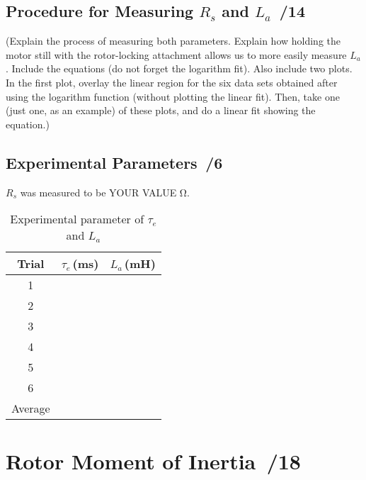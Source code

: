 \documentclass{article}
\newcommand{\score}{\hfill \underline{\hspace{0.65cm}}\,/} %
\begin{document}
\subsection{Procedure for Measuring $R_s$ and $L_a$ \score 14}
(Explain the process of measuring both parameters. Explain how holding the motor still with the rotor-locking attachment allows us to more easily measure $L_a$. Include the equations (do not forget the logarithm fit). 
Also include two plots. In the first plot, overlay the linear region for the six data sets obtained after using the logarithm function (without plotting the linear fit). Then, take one (just one, as an example) of these plots, and do a linear fit showing the equation.)


\subsection{Experimental Parameters \score 6}
$R_s$ was measured to be YOUR VALUE \si{\ohm}.
\begin{table}[phtb] 
\begin{center}
\caption{Experimental parameter of $\tau_e$ and $L_a$}
\label{tbl:lab4_q4}
\begin{tabular}{c|r|r} \hline \hline
\cellcolor{lightgray} Trial & \cellcolor{lightgray} $\tau_e$\,(\si{\milli\second}) & \cellcolor{lightgray} $L_a$\,(\si{\milli\henry}) \\
\hline
1 &  &  \\ \hline
2 &  &  \\ \hline
3 &  &  \\ \hline
4 &  &  \\ \hline
5 &  &  \\ \hline
6 &  &  \\ \hline
Average &  & \\\hline
\end{tabular}
\end{center}
\end{table}

\section{Rotor Moment of Inertia \score 18}
\end{document}
